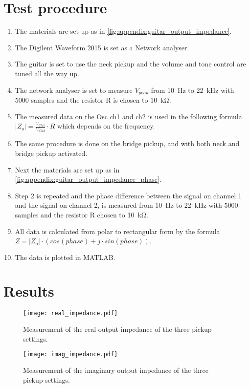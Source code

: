 \newpage

\section*{Test procedure}


\begin{enumerate}
\item The materials are set up as in \autoref{fig:appendix:guitar_output_impedance}.
\item The Digilent Waveform 2015 is set as a Network analyser.
\item  The guitar is set to use the neck pickup and the volume and tone control are tuned all the way up.
\item  The network analyser is set to measure $V_{peak}$ from \SI{10}{\hertz} to \SI{22}{\kilo\hertz} with 5000 samples and the resistor R is chosen to \SI{10}{\kilo\ohm}.
\item The measured data on the Osc ch1 and ch2 is used in the following formula $\left | Z_o \right | = \frac{V_{Ch1}}{V_{Ch2}}\cdot R$ which depends on the frequency. 
\item The same procedure is done on the bridge pickup, and with both neck and bridge pickup activated.
\item Next the materials are set up as in \autoref{fig:appendix:guitar_output_impedance_phase}.
\item Step 2 is repeated and the  phase difference between the signal on channel 1 and the signal on channel 2, is measured from \SI{10}{\hertz} to \SI{22}{\kilo\hertz} with 5000 samples and the resistor R chosen to \SI{10}{\kilo\ohm}.
\item All data is calculated from polar to rectangular form by the formula $Z=\left | Z_o \right | \cdot (cos(phase) + j \cdot sin(phase))$.
\item The data is plotted in MATLAB.
\end{enumerate}

\newpage
\section*{Results}

\begin{figure}[htbp!]
	\centering
		\texttt{[image: real\_impedance.pdf]}
		\caption{Measurement of the real output impedance of the three pickup settings.}
		\label{fig:appendix:real_impedance}
		\texttt{[image: imag\_impedance.pdf]}
		\caption{Measurement of the imaginary output impedance of the three pickup settings.}
		\label{fig:appendix:imaginary_impedance}
\end{figure}

